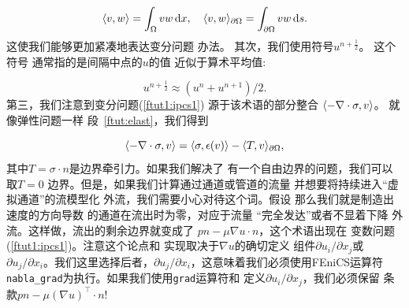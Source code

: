 \[
  \langle v, w \rangle = \int_{\Omega} vw \, \mathrm{d}x, \quad
  \langle v, w \rangle_{\partial\Omega} = \int_{\partial\Omega} vw \, \mathrm{d}s.
\]
这使我们能够更加紧凑地表达变分问题
办法。 其次，我们使用符号$u^{n +\frac{1}{2}}$。 这个符号
通常指的是间隔中点的$u$的值
近似于算术平均值:

\[
  u^{n+\frac{1}{2}} \approx (u^n + u^{n+1}) / 2.
\]
第三，我们注意到变分问题(\ref{ftut1:ipcs1})
源于该术语的部分整合
$\langle -\nabla\cdot\sigma, v \rangle$。 就像弹性问题一样
段~\ref{ftut:elast}，我们得到

\[
  \langle -\nabla\cdot\sigma, v \rangle
  = \langle \sigma, \epsilon(v) \rangle
  - \langle T, v \rangle_{\partial\Omega},
\]
其中$T = \sigma\cdot n$是边界牵引力。如果我们解决了
有一个自由边界的问题，我们可以取$T = 0$
边界。但是，如果我们计算通过通道或管道的流量
并想要将持续进入“虚拟通道”的流模型化
外流，我们需要小心对待这个词。假设
那么我们就是制造出速度的方向导数
的通道在流出时为零，对应于流量
“完全发达”或者不显着下降
外流。这样做，流出的剩余边界就变成了
$pn - \mu\nabla u \cdot n$，这个术语出现在
变数问题(\ref{ftut1:ipcs1})。注意这个论点和
实现取决于$\nabla u$的确切定义
组件$\partial u_i / \partial x_j$或
$\partial u_j / \partial x_i$。我们这里选择后者，$\partial
u_j / \partial x_i$，这意味着我们必须使用FEniCS运算符
\verb!nabla_grad!为执行。如果我们使用\texttt{grad}运算符和
定义$\partial u_i / \partial x_j$，我们必须保留
条款$pn - \mu(\nabla u)^{\top} \cdot n$!


